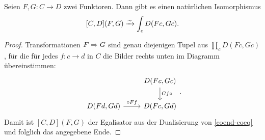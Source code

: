 \begin{lemma}
  \label{trans-end}
  Seien $F, G: C \to D$ zwei Funktoren. Dann gibt es einen natürlichen
  Isomorphismus
  \[ [C, D](F, G) \xrightarrow[]{\sim} \int_c D(Fc, Gc). \]
\end{lemma}
\begin{proof}
  Transformationen $F \Rightarrow G$ sind genau diejenigen Tupel aus
  $\prod_c D(Fc, Gc)$, für die für jedes $f: c \to d$ in $C$ die
  Bilder rechts unten im Diagramm übereinstimmen:
  \[ \begin{tikzcd}
    & D(Fc, Gc) \arrow{d}{Gf \circ} \\
    D(Fd, Gd) \arrow{r}{\circ Ff} & D(Fc, Gd)
  \end{tikzcd}. \]
  Damit ist $[C, D](F, G)$ der Egalisator aus der Dualisierung von
  \ref{coend-coeq} und folglich das angegebene Ende.
\end{proof}

